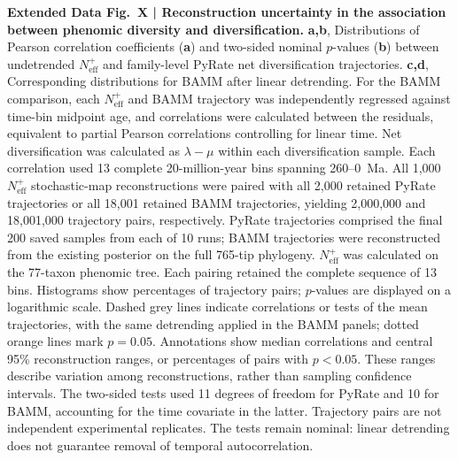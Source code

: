 \noindent\textbf{Extended Data Fig.~X | Reconstruction uncertainty in the association between phenomic diversity and diversification.}
\textbf{a,b}, Distributions of Pearson correlation coefficients (\textbf{a}) and two-sided nominal $p$-values (\textbf{b}) between undetrended $N_{\mathrm{eff}}^{+}$ and family-level PyRate net diversification trajectories.
\textbf{c,d}, Corresponding distributions for BAMM after linear detrending.
For the BAMM comparison, each $N_{\mathrm{eff}}^{+}$ and BAMM trajectory was independently regressed against time-bin midpoint age, and correlations were calculated between the residuals, equivalent to partial Pearson correlations controlling for linear time.
Net diversification was calculated as $\lambda-\mu$ within each diversification sample.
Each correlation used 13 complete 20-million-year bins spanning 260--0~Ma.
All 1,000 $N_{\mathrm{eff}}^{+}$ stochastic-map reconstructions were paired with all 2,000 retained PyRate trajectories or all 18,001 retained BAMM trajectories, yielding 2,000,000 and 18,001,000 trajectory pairs, respectively.
PyRate trajectories comprised the final 200 saved samples from each of 10 runs; BAMM trajectories were reconstructed from the existing posterior on the full 765-tip phylogeny.
$N_{\mathrm{eff}}^{+}$ was calculated on the 77-taxon phenomic tree.
Each pairing retained the complete sequence of 13 bins.
Histograms show percentages of trajectory pairs; $p$-values are displayed on a logarithmic scale.
Dashed grey lines indicate correlations or tests of the mean trajectories, with the same detrending applied in the BAMM panels; dotted orange lines mark $p=0.05$.
Annotations show median correlations and central 95\% reconstruction ranges, or percentages of pairs with $p<0.05$.
These ranges describe variation among reconstructions, rather than sampling confidence intervals.
The two-sided tests used 11 degrees of freedom for PyRate and 10 for BAMM, accounting for the time covariate in the latter.
Trajectory pairs are not independent experimental replicates.
The tests remain nominal: linear detrending does not guarantee removal of temporal autocorrelation.
